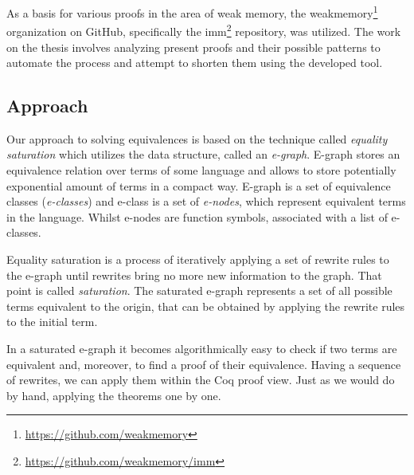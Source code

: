 As a basis for various proofs in the area of weak memory, the weakmemory\footnote{\href{https://github.com/weakmemory}{https://github.com/weakmemory}} organization on GitHub, specifically the imm\footnote{\href{https://github.com/weakmemory/imm}{https://github.com/weakmemory/imm}} repository, was utilized. The work on the thesis involves analyzing present proofs and their possible patterns to automate the process and attempt to shorten them using the developed tool.

\subsection{Approach}
Our approach to solving equivalences is based on the technique called \textit{equality saturation} which utilizes the data structure, called an \textit{e-graph}. E-graph stores an equivalence relation over terms of some language and allows to store potentially exponential amount of terms in a compact way. E-graph is a set of equivalence classes (\textit{e-classes}) and e-class is a set of \textit{e-nodes}, which represent equivalent terms in the language. Whilst e-nodes are function symbols, associated with a list of e-classes. 

Equality saturation is a process of iteratively applying a set of rewrite rules to the e-graph until rewrites bring no more new information to the graph. That point is called \emph{saturation}. The saturated e-graph represents a set of all possible terms  equivalent to the origin, that can be obtained by applying the rewrite rules to the initial term.

In a saturated e-graph it becomes algorithmically easy to check if two terms are equivalent and, moreover, to find a proof of their equivalence. Having a sequence of rewrites, we can apply them within the Coq proof view. Just as we would do by hand, applying the theorems one by one.
